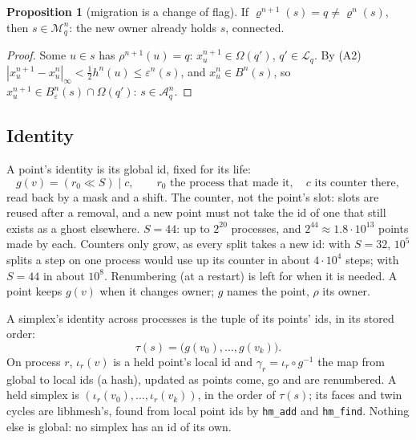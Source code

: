 \documentclass[10pt,a4paper]{article}
\theoremstyle{definition}
\newtheorem{proposition}{Proposition}
\newcommand{\fn}[1]{\texttt{#1}}
\begin{document}
\begin{proposition}[migration is a change of flag]
  \label{prop:migrate}
  If $\varrho^{n+1}(s) = q \ne \varrho^n(s)$, then $s \in \mathcal{M}^n_q$:
  the new owner already holds $s$, connected.
\end{proposition}
\begin{proof}
  Some $u \in s$ has $\rho^{n+1}(u) = q$: $x^{n+1}_u \in \Omega(q')$, $q'
  \in \mathcal{L}_q$. By (A2) $|x^{n+1}_u - x^n_u|_\infty < \tfrac12
  h^n(u) \le \varepsilon^n(s)$, and $x^n_u \in B^n(s)$, so $x^{n+1}_u \in
  B^n_\varepsilon(s) \cap \Omega(q')$: $s \in \mathcal{A}^n_q$.
\end{proof}

\subsection{Identity}
\label{sec:part-id}

A point's identity is its global id, fixed for its life:
\[
  g(v) = (r_0 \ll S) \mid c, \qquad r_0 \text{ the process that made it},
    \quad c \text{ its counter there},
\]
read back by a mask and a shift. The counter, not the point's slot: slots
are reused after a removal, and a new point must not take the id of one
that still exists as a ghost elsewhere. $S = 44$: up to $2^{20}$
processes, and $2^{44} \approx 1.8 \cdot 10^{13}$ points made by each.
Counters only grow, as every split takes a new id: with $S = 32$, $10^5$
splits a step on one process would use up its counter in about $4 \cdot
10^4$ steps; with $S = 44$ in about $10^8$. Renumbering (at a restart)
is left for when it is needed. A point keeps $g(v)$ when it changes owner;
$g$ names the point, $\rho$ its owner.

A simplex's identity across processes is the tuple of its points' ids, in
its stored order:
\[
  \tau(s) = \big( g(v_0), \ldots, g(v_k) \big).
\]
On process $r$, $\iota_r(v)$ is a held point's local id and $\gamma_r =
\iota_r \circ g^{-1}$ the map from global to local ids (a hash), updated as
points come, go and are renumbered. A held simplex is $(\iota_r(v_0),
\ldots, \iota_r(v_k))$, in the order of $\tau(s)$; its faces and twin
cycles are libhmesh's, found from local point ids by \fn{hm\_add} and
\fn{hm\_find}. Nothing else is global: no simplex has an id of its own.
\end{document}
